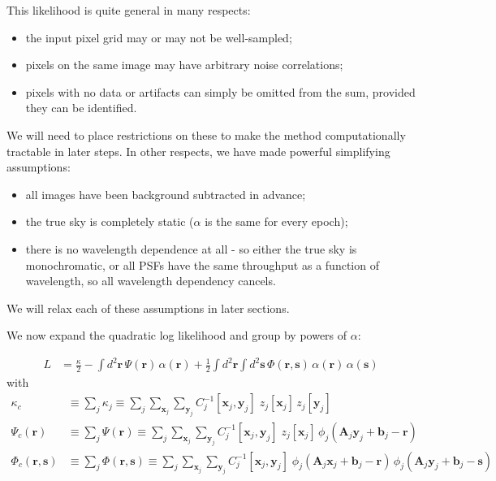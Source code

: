 \documentclass[DM,authoryear,toc]{lsstdoc}
\begin{document}
This likelihood is quite general in many respects:
\begin{itemize}
    \item the input pixel grid may or may not be well-sampled;
    \item pixels on the same image may have arbitrary noise correlations;
    \item pixels with no data or artifacts can simply be omitted from the sum,
    provided they can be identified.
\end{itemize}
We will need to place restrictions on these to make the method computationally tractable in later steps.
In other respects, we have made powerful simplifying assumptions:
\begin{itemize}
    \item all images have been background subtracted in advance;
    \item the true sky is completely static ($α$ is the same for every epoch);
    \item there is no wavelength dependence at all - so either the true sky is monochromatic, or all PSFs have the same throughput as a function of wavelength, so all wavelength dependency cancels.
\end{itemize}
We will relax each of these assumptions in later sections.

We now expand the quadratic log likelihood and group by powers of $α$:

\begin{align}
    L &= \frac{\kappa}{2} - \int\!\!d^2\symbf{r} \, \Psi(\symbf{r}) \, α(\symbf{r})
        +\frac{1}{2}\int\!\!d^2\symbf{r} \! \int\!\!d^2\symbf{s}
            \, \Phi(\symbf{r}, \symbf{s}) \, α(\symbf{r}) \, α(\symbf{s})
\end{align}
with
\begin{align}
    \kappa_c &\equiv \sum_j \kappa_j
        \equiv \sum_j \sum_{\symbf{x}_j} \sum_{\symbf{y}_j}
        C_j^{-1}[\symbf{x}_j, \symbf{y}_j] \; z_j[\symbf{x}_j] \, z_j[\symbf{y}_j] \\
    \Psi_c(\symbf{r}) &\equiv \sum_j \Psi(\symbf{r})
        \equiv \sum_j \sum_{\symbf{x}_j} \sum_{\symbf{y}_j}
        C_j^{-1}[\symbf{x}_j, \symbf{y}_j] \; z_j[\symbf{x}_j] \,
        ϕ_j\!\left(\symbf{A}_j\symbf{y}_j + \symbf{b}_j - \symbf{r}\right) \\
    \Phi_c(\symbf{r}, \symbf{s}) &\equiv \sum_j \Phi(\symbf{r}, \symbf{s})
        \equiv \sum_j \sum_{\symbf{x}_j} \sum_{\symbf{y}_j}
        C_j^{-1}[\symbf{x}_j, \symbf{y}_j] \;
        ϕ_j\!\left(\symbf{A}_j\symbf{x}_j + \symbf{b}_j - \symbf{r}\right) \,
        ϕ_j\!\left(\symbf{A}_j\symbf{y}_j + \symbf{b}_j - \symbf{s}\right) \\
\end{align}
\end{document}
